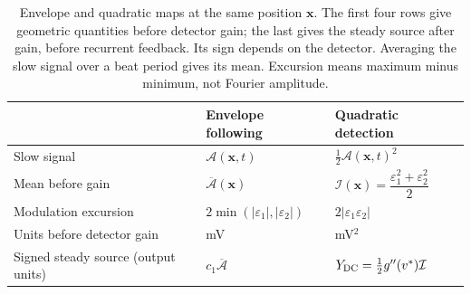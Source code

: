 \documentclass[11pt,a4paper]{article}
\begin{document}
\begin{table}[ht]
\centering\small
\renewcommand{\arraystretch}{1.4}
\begin{tabular}{@{}>{\raggedright\arraybackslash}p{}
 >{\raggedright\arraybackslash}p{}
 >{\raggedright\arraybackslash}p{}@{}}
\toprule
 & Envelope following & Quadratic detection \\
\midrule
Slow signal & $\mathcal A(\mathbf x,t)$ & $\tfrac12\mathcal A(\mathbf x,t)^2$ \\
Mean before gain & $\overline{\mathcal A}(\mathbf x)$
 & $\mathcal I(\mathbf x)=\dfrac{\varepsilon_1^2+\varepsilon_2^2}{2}$ \\
Modulation excursion & $2\min(|\varepsilon_1|,|\varepsilon_2|)$
 & $2|\varepsilon_1\varepsilon_2|$ \\
Units before detector gain & mV & mV$^2$ \\
Signed steady source (output units) & $c_1\overline{\mathcal A}$
 & $Y_{\rm DC}=\tfrac12g''(v^*)\mathcal I$ \\
\bottomrule
\end{tabular}
\caption{Envelope and quadratic maps at the same position $\mathbf x$.
The first four rows give geometric quantities before detector gain; the last
gives the steady source after gain, before recurrent feedback. Its sign depends
on the detector. Averaging the slow signal over a beat period gives its mean.
Excursion means maximum minus minimum, not Fourier amplitude.}
\label{tab:transduction-maps}
\end{table}
\end{document}
